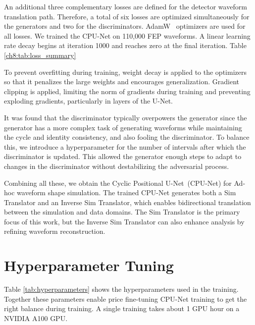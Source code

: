 An additional three complementary losses are defined for the detector waveform translation path. Therefore, a total of six losses are optimized simultaneously for the generators and two for the discriminators. AdamW~\cite{adam_w_paper} optimizers are used for all losses. We trained the CPU-Net on 110,000 FEP waveforms. A linear learning rate decay begins at iteration 1000 and reaches zero at the final iteration. Table \ref{ch8:tab:loss_summary}




To prevent overfitting during training, weight decay is applied to the optimizers so that it penalizes the large weights and encourages generalization. Gradient clipping is applied, limiting the norm of gradients during training and preventing exploding gradients, particularly in layers of the U-Net.

It was found that the discriminator typically overpowers the generator since the generator has a more complex task of generating waveforms while maintaining the cycle and identity consistency, and also fooling the discriminator. To balance this, we introduce a hyperparameter for the number of intervals after which the discriminator is updated. This allowed the generator enough steps to adapt to changes in the discriminator without destabilizing the adversarial process.

Combining all these, we obtain the Cyclic Positional U-Net~(CPU-Net) for Ad-hoc waveform shape simulation. The trained CPU-Net generates both a Sim Translator and an Inverse Sim Translator, which enables bidirectional translation between the simulation and data domains. The Sim Translator is the primary focus of this work, but the Inverse Sim Translator can also enhance analysis by refining waveform reconstruction. 

\section{Hyperparameter Tuning}



Table \ref{tab:hyperparameters} shows the hyperparameters used in the training. Together these parameters enable price fine-tuning CPU-Net training to get the right balance during training. A single training takes about 1 GPU hour on a NVIDIA A100 GPU.